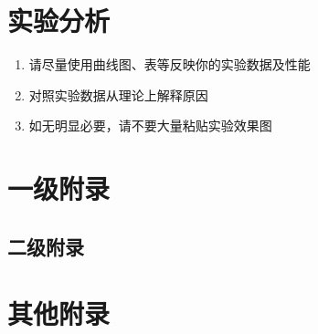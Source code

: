 \documentclass[lang=cn,11pt,a4paper,cite=super]{whureport}
\begin{document}
\section{实验分析}
{\kaishu \begin{enumerate}
	\item 请尽量使用曲线图、表等反映你的实验数据及性能
	\item 对照实验数据从理论上解释原因
	\item 如无明显必要，请不要大量粘贴实验效果图
\end{enumerate}}






\newpage

\nocite{*}


\appendix
\addappheadtotoc
\section{一级附录}
\subsection{二级附录}


\section{其他附录}
\end{document}
